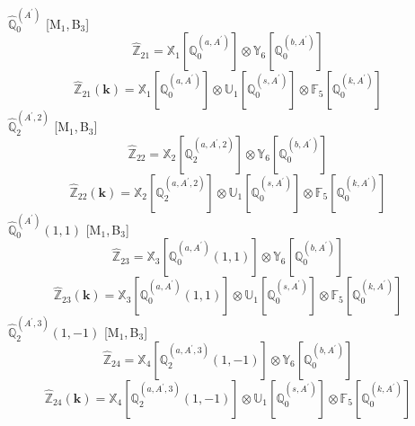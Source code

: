 \documentclass[fleqn,10pt,landscape]{article}
\begin{document}
\begin{itemize}
\begin{dmath*}
\end{dmath*}
\vspace{4mm}
\noindent {} $\,\,\,\hat{\mathbb{Q}}_{0}^{(A^{\prime})}$ [M$_{1}$,\,B$_{3}$]
\begin{dmath*}
\hat{\mathbb{Z}}_{21}=\mathbb{X}_{1}[\mathbb{Q}_{0}^{(a,A^{\prime})}] \otimes\mathbb{Y}_{6}[\mathbb{Q}_{0}^{(b,A^{\prime})}]
\end{dmath*}
\begin{dmath*}
\hat{\mathbb{Z}}_{21}(\bm{k})=\mathbb{X}_{1}[\mathbb{Q}_{0}^{(a,A^{\prime})}] \otimes\mathbb{U}_{1}[\mathbb{Q}_{0}^{(s,A^{\prime})}] \otimes\mathbb{F}_{5}[\mathbb{Q}_{0}^{(k,A^{\prime})}]
\end{dmath*}
\vspace{4mm}
\noindent {} $\,\,\,\hat{\mathbb{Q}}_{2}^{(A^{\prime},2)}$ [M$_{1}$,\,B$_{3}$]
\begin{dmath*}
\hat{\mathbb{Z}}_{22}=\mathbb{X}_{2}[\mathbb{Q}_{2}^{(a,A^{\prime},2)}] \otimes\mathbb{Y}_{6}[\mathbb{Q}_{0}^{(b,A^{\prime})}]
\end{dmath*}
\begin{dmath*}
\hat{\mathbb{Z}}_{22}(\bm{k})=\mathbb{X}_{2}[\mathbb{Q}_{2}^{(a,A^{\prime},2)}] \otimes\mathbb{U}_{1}[\mathbb{Q}_{0}^{(s,A^{\prime})}] \otimes\mathbb{F}_{5}[\mathbb{Q}_{0}^{(k,A^{\prime})}]
\end{dmath*}
\vspace{4mm}
\noindent {} $\,\,\,\hat{\mathbb{Q}}_{0}^{(A^{\prime})}(1,1)$ [M$_{1}$,\,B$_{3}$]
\begin{dmath*}
\hat{\mathbb{Z}}_{23}=\mathbb{X}_{3}[\mathbb{Q}_{0}^{(a,A^{\prime})}(1,1)] \otimes\mathbb{Y}_{6}[\mathbb{Q}_{0}^{(b,A^{\prime})}]
\end{dmath*}
\begin{dmath*}
\hat{\mathbb{Z}}_{23}(\bm{k})=\mathbb{X}_{3}[\mathbb{Q}_{0}^{(a,A^{\prime})}(1,1)] \otimes\mathbb{U}_{1}[\mathbb{Q}_{0}^{(s,A^{\prime})}] \otimes\mathbb{F}_{5}[\mathbb{Q}_{0}^{(k,A^{\prime})}]
\end{dmath*}
\vspace{4mm}
\noindent {} $\,\,\,\hat{\mathbb{Q}}_{2}^{(A^{\prime},3)}(1,-1)$ [M$_{1}$,\,B$_{3}$]
\begin{dmath*}
\hat{\mathbb{Z}}_{24}=\mathbb{X}_{4}[\mathbb{Q}_{2}^{(a,A^{\prime},3)}(1,-1)] \otimes\mathbb{Y}_{6}[\mathbb{Q}_{0}^{(b,A^{\prime})}]
\end{dmath*}
\begin{dmath*}
\hat{\mathbb{Z}}_{24}(\bm{k})=\mathbb{X}_{4}[\mathbb{Q}_{2}^{(a,A^{\prime},3)}(1,-1)] \otimes\mathbb{U}_{1}[\mathbb{Q}_{0}^{(s,A^{\prime})}] \otimes\mathbb{F}_{5}[\mathbb{Q}_{0}^{(k,A^{\prime})}]

\end{dmath*}
\end{itemize}
\end{document}
